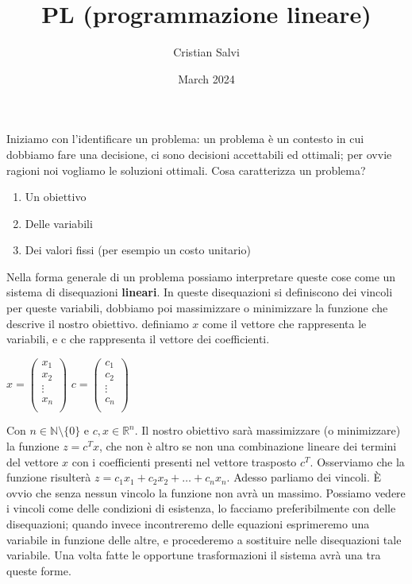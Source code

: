 \documentclass{article}
\title{PL (programmazione lineare)}
\author{Cristian Salvi}
\date{March 2024}
\begin{document}
\maketitle

    Iniziamo con l'identificare un problema: un problema è un contesto in cui dobbiamo fare una decisione, ci sono decisioni accettabili ed ottimali; per ovvie ragioni noi vogliamo le soluzioni ottimali.\newline
    Cosa caratterizza un problema?
    \begin{enumerate}
        \item Un obiettivo
        \item Delle variabili
        \item Dei valori fissi (per esempio un costo unitario)
    \end{enumerate}
    Nella forma generale di un problema possiamo interpretare queste cose come un sistema di disequazioni \textbf{lineari}. In queste disequazioni si definiscono dei vincoli per queste variabili, dobbiamo poi massimizzare o minimizzare la funzione che descrive il nostro obiettivo.\newline
    definiamo $x$ come il vettore che rappresenta le variabili, e c che rappresenta il vettore dei coefficienti.

    \begin{center}
    
    $x = \begin{pmatrix}
        x_{1} \\
        x_{2} \\
        \vdots \\
        x_{n} \\
    \end{pmatrix}$
    $c = \begin{pmatrix}
        c_{1} \\
        c_{2} \\
        \vdots \\
        c_{n} \\
    \end{pmatrix}$
    
    \end{center}

    Con $n \in \mathbb{N} \setminus \{0\}$ e $c, x \in \mathbb{R}^n$. Il nostro obiettivo sarà massimizzare (o minimizzare) la funzione $z = c^{T}x$, che non è altro se non una combinazione lineare dei termini del vettore $x$ con i coefficienti presenti nel vettore trasposto $c^T$. Osserviamo che la funzione risulterà $z = c_{1}x_{1} + c_{2}x_{2} + \dots + c_{n}x_{n}$.\newline
    Adesso parliamo dei vincoli. È ovvio che senza nessun vincolo la funzione non avrà un massimo. Possiamo vedere i vincoli come delle condizioni di esistenza, lo facciamo preferibilmente con delle disequazioni; quando invece incontreremo delle equazioni esprimeremo una variabile in funzione delle altre, e procederemo a sostituire nelle disequazioni tale variabile. Una volta fatte le opportune trasformazioni il sistema avrà una tra queste forme.
\end{document}
